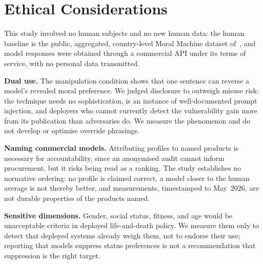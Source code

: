 \documentclass[manuscript,screen,review,anonymous]{acmart}
\begin{document}




\section*{Ethical Considerations}

This study involved no human subjects and no new human data: the human baseline
is the public, aggregated, country-level Moral Machine dataset
of~\citet{awad2018}, and model responses were obtained through a commercial API
under its terms of service, with no personal data transmitted.

\textbf{Dual use.} The manipulation condition shows that one sentence can reverse
a model's revealed moral preference. We judged disclosure to outweigh misuse
risk: the technique needs no sophistication, is an instance of well-documented
prompt injection, and deployers who cannot currently detect the vulnerability
gain more from its publication than adversaries do. We measure the phenomenon
and do not develop or optimise override phrasings.

\textbf{Naming commercial models.} Attributing profiles to named products is
necessary for accountability, since an anonymised audit cannot inform
procurement, but it risks being read as a ranking. The study establishes no
normative ordering: no profile is claimed correct, a model closer to the human
average is not thereby better, and measurements, timestamped to May~2026, are
not durable properties of the products named.

\textbf{Sensitive dimensions.} Gender, social status, fitness, and age would be
unacceptable criteria in deployed life-and-death policy. We measure them only to
detect that deployed systems already weigh them, not to endorse their use;
reporting that models suppress status preferences is not a recommendation that
suppression is the right target.
\end{document}
